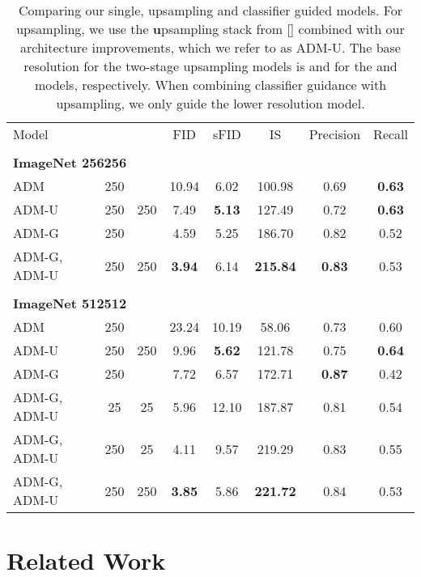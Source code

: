 \documentclass{article}
\newcommand{\namecite}[1]{\citeauthor{#1} [\citenum{#1}]}
\begin{document}
\begin{table}[t]
    \begin{center}
    \begin{small}
    \begin{tabular}{lccccccc}
    \toprule
    Model &  &  & FID   & sFID  & IS     & Precision & Recall \\
    \\
    \multicolumn{8}{l}{\bf{ImageNet} 256256} \\
    \toprule
    ADM & 250 & & 10.94 & 6.02 & 100.98 & 0.69 & \bf{0.63} \\
    ADM-U & 250 & 250 & 7.49 & \bf{5.13} & 127.49 & 0.72 & \bf{0.63} \\
    ADM-G & 250 & & 4.59 & 5.25 & 186.70 & 0.82 & 0.52 \\
    ADM-G, ADM-U & 250 & 250 & \bf{3.94} & 6.14      & \bf{215.84} & \bf{0.83} & 0.53 \\
    \\
    \multicolumn{8}{l}{\bf{ImageNet} 512512} \\
    \toprule
    ADM & 250   &    & 23.24 &	10.19 & 58.06 & 0.73  & 0.60 \\
    ADM-U & 250 & 250  & 9.96      & \bf{5.62} & 121.78      & 0.75      & \bf{0.64} \\
    ADM-G & 250    &   & 7.72      & 6.57      & 172.71      & \bf{0.87} & 0.42 \\
    ADM-G, ADM-U & 25 & 25    & 5.96      & 12.10     & 187.87      & 0.81      & 0.54 \\
    ADM-G, ADM-U & 250 & 25   & 4.11      & 9.57      & 219.29      & 0.83      & 0.55 \\
    ADM-G, ADM-U & 250 & 250  & \bf{3.85} & 5.86      & \bf{221.72} & 0.84      & 0.53 \\
    \end{tabular}
    \end{small}
    \end{center}
    \caption{Comparing our single, upsampling and classifier guided models. For upsampling, we use the \textbf{u}psampling stack from \namecite{improved} combined with our architecture improvements, which we refer to as ADM-U. The base resolution for the two-stage upsampling models is  and  for the  and  models, respectively. When combining classifier guidance with upsampling, we only guide the lower resolution model.}
    \label{tab:upsample}
    \vskip -0.2in
\end{table}

\section{Related Work}
\label{sec:relwork}
\end{document}
